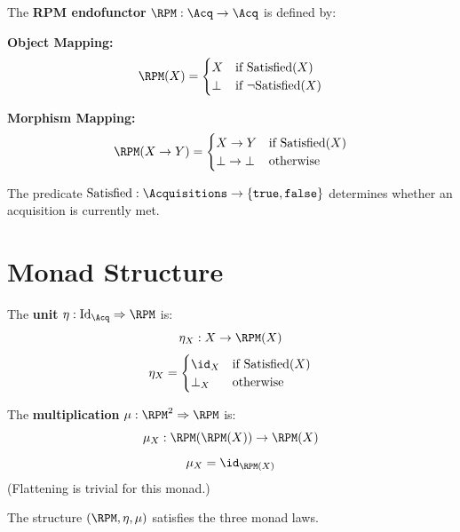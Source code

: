 \begin{definition}
\label{def:rpm-endofunctor}
The \textbf{RPM endofunctor} $\RPM : \Acq \to \Acq$ is defined by:

\textbf{Object Mapping:}
\[
\RPM(X) = \begin{cases}
X & \text{if } \mathrm{Satisfied}(X) \\
\bot & \text{if } \neg\mathrm{Satisfied}(X)
\end{cases}
\]

\textbf{Morphism Mapping:}
\[
\RPM(X \to Y) = \begin{cases}
X \to Y & \text{if } \mathrm{Satisfied}(X) \\
\bot \to \bot & \text{otherwise}
\end{cases}
\]
\end{definition}

\begin{definition}
\label{def:satisfied}
The predicate $\mathrm{Satisfied} : \Acquisitions \to \{\mathtt{true}, \mathtt{false}\}$ determines whether an acquisition is currently met.
\end{definition}

\section{Monad Structure}

\begin{definition}
\label{def:rpm-unit}
The \textbf{unit} $\eta : \mathrm{Id}_{\Acq} \Rightarrow \RPM$ is:
\[
\eta_X : X \to \RPM(X)
\]
\[
\eta_X = \begin{cases}
\id_X & \text{if } \mathrm{Satisfied}(X) \\
\bot_X & \text{otherwise}
\end{cases}
\]
\end{definition}

\begin{definition}
\label{def:rpm-mult}
The \textbf{multiplication} $\mu : \RPM^2 \Rightarrow \RPM$ is:
\[
\mu_X : \RPM(\RPM(X)) \to \RPM(X)
\]
\[
\mu_X = \id_{\RPM(X)}
\]
(Flattening is trivial for this monad.)
\end{definition}

\begin{theorem}
\label{thm:rpm-monad-laws}
The structure $(\RPM, \eta, \mu)$ satisfies the three monad laws.
\end{theorem}

